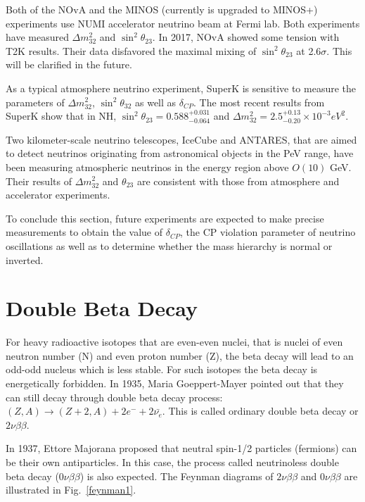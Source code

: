 \documentclass[preprint,12pt]{elsarticle}
\numberwithin{equation}{section}
\begin{document}
Both of the NOvA and the MINOS (currently is upgraded to MINOS+) experiments use NUMI accelerator neutrino beam at Fermi lab. Both experiments have measured $\Delta m^2_{32}$ and $\sin^2\theta_{23}$. In 2017, NOvA showed some tension with T2K results. Their data disfavored the maximal mixing of $\sin^2\theta_{23}$ at 2.6$\sigma$. This will be clarified in the future\cite{nova}.

As a typical atmosphere neutrino experiment, SuperK is sensitive to measure the parameters of $\Delta m^2_{32}$, $\sin^2\theta_{32}$ as well as $\delta_{CP}$. The most recent results from SuperK show that in NH, $\sin^2\theta_{23}=0.588^{+0.031}_{-0.064}$ and $\Delta m^2_{32} = 2.5^{+0.13}_{-0.20}\times 10^{-3} eV^2$\cite{superk_new}. 

Two kilometer-scale neutrino telescopes, IceCube and ANTARES, that are aimed to detect neutrinos originating from astronomical objects in the PeV range, have been measuring atmospheric neutrinos in the energy region above $O(10)$ GeV. Their results of $\Delta m^2_{32}$ and $\theta_{23}$ are consistent with those from atmosphere and accelerator experiments\cite{stateofart}.  

To conclude this section, future experiments are expected to make precise measurements to obtain the value of $\delta_{CP}$, the CP violation parameter of neutrino oscillations as well as to determine whether the mass hierarchy is normal or inverted.

\section{Double Beta Decay}

For heavy radioactive isotopes that are even-even nuclei, that is nuclei of even neutron number (N) and even proton number (Z), the beta decay will lead to an odd-odd nucleus which is less stable. For such isotopes the beta decay is energetically forbidden. In 1935, Maria Goeppert-Mayer pointed out that they can still decay through double beta decay process: $(Z,A) \to (Z+2,A)+2e^{-}+2\bar{\nu_e}$. This is called ordinary double beta decay or $2\nu\beta\beta$\cite{martin}.

In 1937, Ettore Majorana proposed that neutral spin-1/2 particles (fermions) can be their own antiparticles\cite{majorana}. In this case, the process called neutrinoless double beta decay ($0\nu\beta\beta$) is also expected. The Feynman diagrams of $2\nu\beta\beta$ and $0\nu\beta\beta$ are illustrated in Fig.~\ref{feynman1}.
\end{document}
